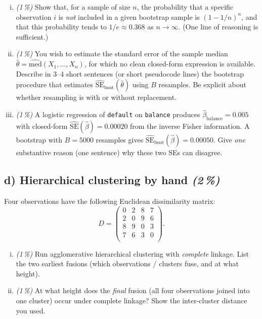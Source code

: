 \documentclass[11pt,a4paper]{article}
\newcommand{\subpoints}[1]{\textit{(#1\,\%)}}
\begin{document}
\begin{enumerate}[(i)]
  \item \subpoints{1} Show that, for a sample of size $n$, the probability that a specific observation $i$ is \emph{not} included in a given bootstrap sample is $(1 - 1/n)^n$, and that this probability tends to $1/e \approx 0.368$ as $n \to \infty$. (One line of reasoning is sufficient.)
  \item \subpoints{1} You wish to estimate the standard error of the sample median $\hat\theta = \widehat{\mathrm{med}}(X_1, \ldots, X_n)$, for which no clean closed-form expression is available. Describe in $3$--$4$ short sentences (or short pseudocode lines) the bootstrap procedure that estimates $\widehat{\mathrm{SE}}_{\text{boot}}(\hat\theta)$ using $B$ resamples. Be explicit about whether resampling is with or without replacement.
  \item \subpoints{1} A logistic regression of \texttt{default} on \texttt{balance} produces $\hat\beta_{\text{balance}} = 0.005$ with closed-form $\widehat{\mathrm{SE}}(\hat\beta) = 0.00020$ from the inverse Fisher information. A bootstrap with $B = 5000$ resamples gives $\widehat{\mathrm{SE}}_{\text{boot}}(\hat\beta) = 0.00050$. Give \emph{one} substantive reason (one sentence) why these two SEs can disagree.
\end{enumerate}

\subsection*{d) Hierarchical clustering by hand \subpoints{2}}

Four observations have the following Euclidean dissimilarity matrix:
$$D = \begin{pmatrix}
0 & 2 & 8 & 7 \\
2 & 0 & 9 & 6 \\
8 & 9 & 0 & 3 \\
7 & 6 & 3 & 0 \\
\end{pmatrix}.$$

\begin{enumerate}[(i)]
  \item \subpoints{1} Run agglomerative hierarchical clustering with \emph{complete} linkage. List the two earliest fusions (which observations / clusters fuse, and at what height).
  \item \subpoints{1} At what height does the \emph{final} fusion (all four observations joined into one cluster) occur under complete linkage? Show the inter-cluster distance you used.
\end{enumerate}
\end{document}
